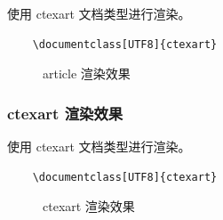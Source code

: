 \documentclass[UTF8,AutoFakeBold]{ctexart}
\numberwithin{figure}{section}
\numberwithin{table}{section}
\begin{document}
使用 ctexart 文档类型进行渲染。
\begin{lstlisting}
    \documentclass[UTF8]{ctexart}
\end{lstlisting}
\begin{center}
    \begin{figure}[H]
        \centering
        \setlength{\fboxrule}{0.1pt}
        \setlength{\fboxsep}{0cm}
        \caption{article 渲染效果}
        \label{Fig:article_render}
    \end{figure}
\end{center}


\subsubsection{ctexart 渲染效果}

使用 ctexart 文档类型进行渲染。
\begin{lstlisting}
    \documentclass[UTF8]{ctexart}
\end{lstlisting}

\begin{center}
    \begin{figure}[H]
        \centering
        \setlength{\fboxrule}{0.1pt}
        \setlength{\fboxsep}{0cm}
        \caption{ctexart 渲染效果}
        \label{Fig:ctexart_render}
    \end{figure}
\end{center}
\end{document}
